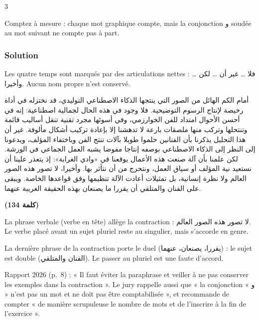 \documentclass[11pt,a4paper]{article}
\begin{document}
\begin{indication}{3}

Comptez à mesure : chaque mot graphique compte, mais la conjonction و soudée au mot suivant ne compte pas à part.

\end{indication}

\hypertarget{solution-4}{%
\subsubsection{Solution}\label{solution-4}}

Les quatre temps sont marqués par des articulations nettes : فلا \ldots{} غير أن \ldots{} لكن \ldots{} وأخيرا. Aucun nom propre n'est conservé.

أمام الكم الهائل من الصور التي ينتجها الذكاء الاصطناعي التوليدي، قد نختزله في أداة رخيصة لإنتاج الرسوم التوضيحية. فلا وجود في هذه الحال لجمالية اصطناعية: إنه في أحسن الأحوال امتداد للفن الخوارزمي، وفي أسوئها مجرد تقنية تنقل أساليب قائمة وتنتحلها وتركب منها ملصقات بارعة لا تدهشنا إلا بإعادة تركيب أشكال مألوفة. غير أن هذا التحليل يذكرنا بأن الفنانين حلموا طويلا بآلات تنتج الفن وباختفاء المؤلف، ويدعونا إلى النظر إلى الذكاء الاصطناعي بوصفه إنتاجا مفوضا يشبه العمل الجماعي في الورشة. لكن علمنا بأن آلة صنعت هذه الأعمال يوقعنا في «وادي الغرابة»: إذ يتعذر علينا أن نستعيد نية المؤلف أو سياق العمل، ونتحرج من أن نتأثر بها. وأخيرا، لا تصور هذه الصور العالم ولا نظرة إنسانية، بل تمثيلات أعادت الآلة تنظيمها وفق قواعدها الخاصة. ويبقى على الفنان والمتلقي أن يقررا ما يصنعان بهذه الحقيقة الغريبة عنهما.

\textbf{(134 كلمة)}

\begin{methode}

La phrase verbale (verbe en tête) allège la contraction : لا تصور هذه الصور العالم. Le verbe placé avant un sujet pluriel reste au singulier, mais s'accorde en genre.

\end{methode}

\begin{piege}

La dernière phrase de la contraction porte le duel (يقررا، يصنعان، عنهما) : le sujet est double (الفنان والمتلقي). Le passer au pluriel est une faute d'accord.

\end{piege}

\begin{jury}

Rapport 2026 (p.~8) : « Il faut éviter la paraphrase et veiller à ne pas conserver les exemples dans la contraction ». Le jury rappelle aussi que « la conjonction « و » n'est pas un mot et ne doit pas être comptabilisée », et recommande de compter « de manière scrupuleuse le nombre de mots et de l'inscrire à la fin de l'exercice ».

\end{jury}
\end{document}
